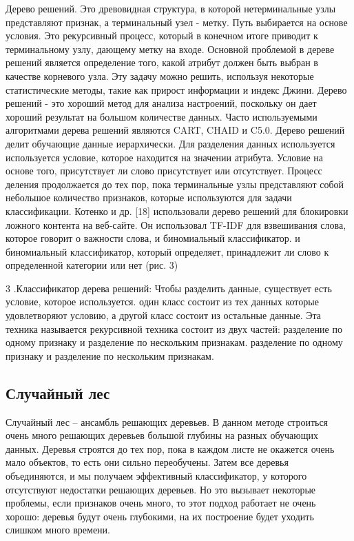 Дерево решений. Это древовидная структура, в которой нетерминальные узлы
представляют признак, а терминальный узел - метку. Путь выбирается на основе
условия. Это рекурсивный процесс, который в конечном итоге приводит к
терминальному узлу, дающему метку на входе.
Основной проблемой в дереве решений является определение того, какой атрибут
должен быть выбран в качестве корневого узла. Эту задачу можно решить, используя
некоторые статистические методы, такие как прирост информации и индекс Джини.
Дерево решений - это хороший метод для анализа настроений, поскольку он дает
хороший результат на большом количестве данных. Часто используемыми алгоритмами
дерева решений являются CART, CHAID и C5.0. Дерево решений делит обучающие
данные иерархически. Для разделения данных используется используется условие,
которое находится на значении атрибута. Условие на основе того, присутствует ли
слово присутствует или отсутствует. Процесс деления продолжается до тех пор,
пока терминальные узлы представляют собой небольшое количество признаков,
которые используются для задачи классификации. Котенко и др. [18] использовали
дерево решений для блокировки ложного контента на веб-сайте. Он использовал
TF-IDF для взвешивания слова, которое говорит о важности слова, и биномиальный
классификатор. и биномиальный классификатор, который определяет, принадлежит ли
слово к определенной категории или нет (рис. 3)~\cite{article16}

3 .Классификатор дерева решений: Чтобы разделить данные, существует есть
условие, которое используется. один класс состоит из тех данных которые
удовлетворяют условию, а другой класс состоит из остальные данные. Эта техника
называется рекурсивной техника состоит из двух частей: разделение по одному
признаку и разделение по нескольким признакам. разделение по одному признаку и
разделение по нескольким признакам.~\cite{article18}

\subsection{Случайный лес}

Случайный лес – ансамбль решающих деревьев. В данном методе строиться очень
много решающих деревьев большой глубины на разных обучающих данных. Деревья
строятся до тех пор, пока в каждом листе не окажется очень мало объектов, то
есть они сильно переобучены.  Затем все деревья объединяются, и мы получаем
эффективный классификатор, у которого отсутствуют недостатки решающих деревьев.
Но это вызывает некоторые проблемы, если признаков очень много, то этот подход
работает не очень хорошо: деревья будут очень глубокими, на их построение будет
уходить слишком много времени.~\cite{article9}

